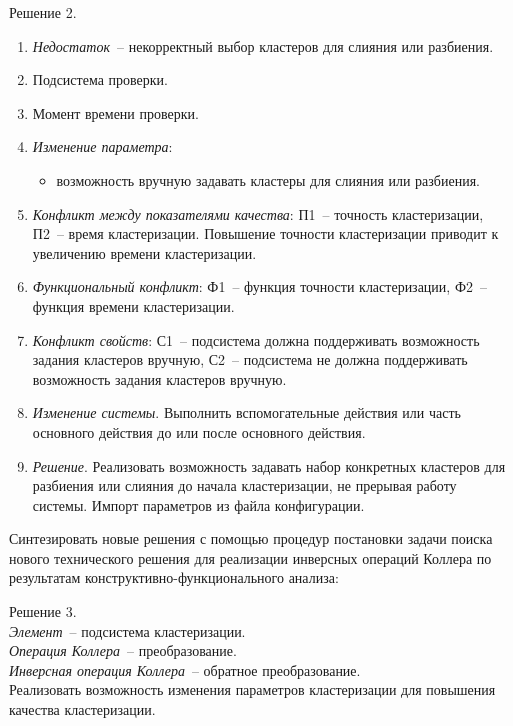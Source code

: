 Решение 2.
\begin{enumerate}
  \item \emph{Недостаток}~-- некорректный выбор кластеров для слияния или
    разбиения.
  \item Подсистема проверки.
  \item Момент времени проверки.
  \item \emph{Изменение параметра}:
    \begin{itemize}
      \item возможность вручную задавать кластеры для слияния или разбиения.
    \end{itemize}
  \item \emph{Конфликт между показателями качества}: П1~-- точность
    кластеризации, П2~-- время кластеризации. Повышение точности кластеризации
    приводит к увеличению времени кластеризации.
  \item \emph{Функциональный конфликт}: Ф1~-- функция точности кластеризации,
    Ф2~-- функция времени кластеризации.
  \item \emph{Конфликт свойств}: С1~-- подсистема должна поддерживать
    возможность задания кластеров вручную, С2~-- подсистема не должна
    поддерживать возможность задания кластеров вручную.
  \item \emph{Изменение системы}. Выполнить вспомогательные действия или часть
    основного действия до или после основного действия.
  \item \emph{Решение}. Реализовать возможность задавать набор конкретных
    кластеров для разбиения или слияния до начала кластеризации, не прерывая
    работу системы. Импорт параметров из файла конфигурации.
\end{enumerate}

\newpage

Синтезировать новые решения с помощью процедур постановки задачи поиска нового
технического решения для реализации инверсных операций Коллера по результатам
конструктивно-функционального анализа:

Решение 3.\\
\emph{Элемент}~-- подсистема кластеризации.\\
\emph{Операция Коллера}~-- преобразование.\\
\emph{Инверсная операция Коллера}~-- обратное преобразование.\\
Реализовать возможность изменения параметров кластеризации для повышения
качества кластеризации.\\

